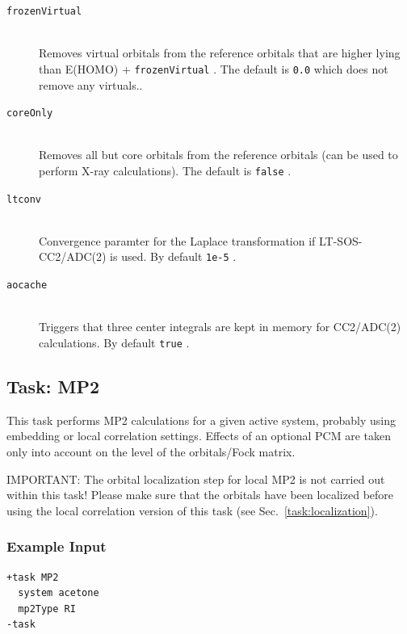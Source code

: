 \documentclass[bibliography=totocnumbered,a4paper,10pt,oneside]{scrbook}
\newcommand{\ttt}[1]{%
  \begingroup\setlength{\fboxsep}{1pt}%
  \colorbox{serenity-green!30}{\texttt{\hspace*{2pt}\vphantom{(g}#1\hspace*{2pt}}}%
  \endgroup
}
\begin{document}
\begin{description}
    \item[\texttt{frozenVirtual}]\hfill\\
    Removes virtual orbitals from the reference orbitals that are higher lying than E(HOMO) + \ttt{frozenVirtual}. The default is \ttt{0.0} which does not remove any virtuals..
    \item[\texttt{coreOnly}]\hfill\\
    Removes all but core orbitals from the reference orbitals (can be used to perform X-ray calculations). The default is \ttt{false}.
    \item[\texttt{ltconv}]\hfill \\
	  Convergence paramter for the Laplace transformation if LT-SOS-CC2/ADC(2) is used. By default \ttt{1e-5}.
    \item[\texttt{aocache}]\hfill \\
	  Triggers that three center integrals are kept in memory for CC2/ADC(2) calculations. By default \ttt{true}.
\end{description}

\clearpage
\subsection{Task: MP2}\label{task: mp2}
\label{sec:MP2}
This task performs MP2 calculations for a given active system, probably using embedding or local correlation
settings. Effects of an optional PCM are taken only into account on the level of the orbitals/Fock matrix.

{\color{red}IMPORTANT:} The orbital localization step for local MP2 is not carried out
within this task! Please make sure that the orbitals have been localized before using the local
correlation version of this task (see Sec.~\ref{task:localization}).
\subsubsection{Example Input}
\begin{lstlisting}
+task MP2
  system acetone
  mp2Type RI
-task
\end{lstlisting}
\end{document}
